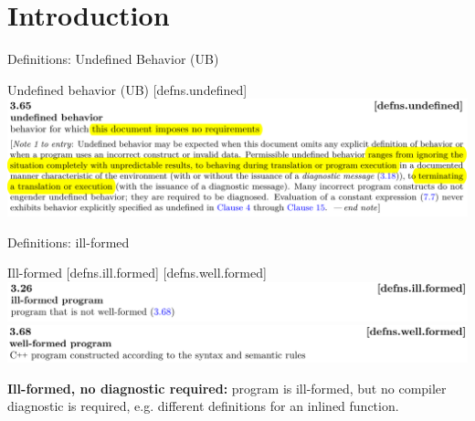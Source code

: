 \section{Introduction}

\begin{frame}{Definitions: Undefined Behavior (UB)}
  \begin{block}{Undefined behavior (UB) [defns.undefined]}
    \includegraphics[width=\textwidth]{img/cplusplus_draft/defns.undefined.png}
  \end{block}
\end{frame}

\begin{frame}{Definitions: ill-formed}
  \begin{block}{Ill-formed [defns.ill.formed] [defns.well.formed]}
    \includegraphics[width=\textwidth]{img/cplusplus_draft/defns.ill.formed.png}\\[1em]
    \includegraphics[width=\textwidth]{img/cplusplus_draft/defns.well.formed.png}

    \vspace{1em}
    {\bfseries Ill-formed, no diagnostic required:} program is ill-formed, but no compiler diagnostic is required, e.g. different definitions for an inlined function.
  \end{block}
\end{frame}

